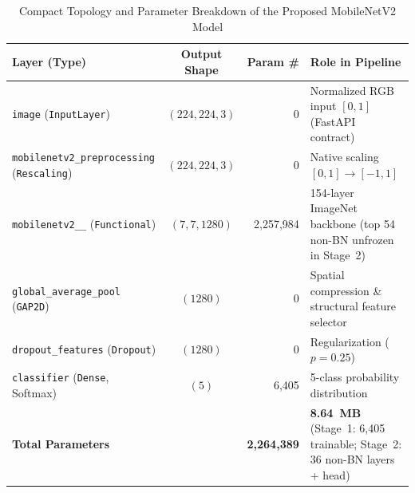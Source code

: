 \begin{table}[htbp]
\caption{Compact Topology and Parameter Breakdown of the Proposed MobileNetV2 Model}
\label{tab:mnv2_layers}
\begin{center}
\small
\setlength{\tabcolsep}{4pt}
\begin{tabularx}{\textwidth}{| L{4.1cm} | c | r | X |}
\hline
\textbf{Layer (Type)} & \textbf{Output Shape} & \textbf{Param \#} & \textbf{Role in Pipeline} \\
\hline
\texttt{image} (\texttt{InputLayer}) & $(224,224,3)$ & 0 & Normalized RGB input $[0, 1]$ (FastAPI contract) \\
\hline
\texttt{mobilenetv2\_\allowbreak preprocessing} (\texttt{Rescaling}) & $(224,224,3)$ & 0 & Native scaling $[0, 1] \rightarrow [-1, 1]$ \\
\hline
\texttt{mobilenetv2\_\_} (\texttt{Functional}) & $(7,7,1280)$ & 2,257,984 & 154-layer ImageNet backbone (top 54 non-BN unfrozen in Stage~2) \\
\hline
\texttt{global\_\allowbreak average\_\allowbreak pool} (\texttt{GAP2D}) & $(1280)$ & 0 & Spatial compression \& structural feature selector \\
\hline
\texttt{dropout\_\allowbreak features} (\texttt{Dropout}) & $(1280)$ & 0 & Regularization ($p = 0.25$) \\
\hline
\texttt{classifier} (\texttt{Dense}, Softmax) & $(5)$ & 6,405 & 5-class probability distribution \\
\hline
\textbf{Total Parameters} & & \textbf{2,264,389} & \textbf{8.64~MB} (Stage~1: 6,405 trainable; Stage~2: 36 non-BN layers + head) \\
\hline
\end{tabularx}
\end{center}
\end{table}

